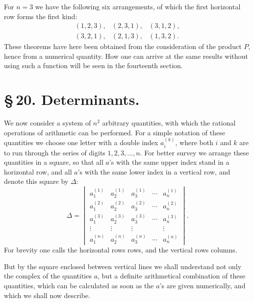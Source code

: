 \documentclass[11pt]{article}
\begin{document}
For \(n=3\) we have the following six arrangements, of which the first horizontal row forms the first kind:
\[
\begin{array}{ccc}
(1,2,3),&(2,3,1),&(3,1,2),\\
(3,2,1),&(2,1,3),&(1,3,2).
\end{array}
\]
These theorems have here been obtained from the consideration of the product \(P\), hence from a numerical quantity. How one can arrive at the same results without using such a function will be seen in the fourteenth section.

\section*{\S\,20. Determinants.}

We now consider a system of \(n^2\) arbitrary quantities, with which the rational operations of arithmetic can be performed. For a simple notation of these quantities we choose one letter with a double index \(a_i^{(k)}\), where both \(i\) and \(k\) are to run through the series of digits \(1,2,3,\ldots,n\). For better survey we arrange these quantities in a square, so that all \(a\)'s with the same upper index stand in a horizontal row, and all \(a\)'s with the same lower index in a vertical row, and denote this square by \(\Delta\):
\begin{equation}
\Delta=
\begin{vmatrix}
 a_1^{(1)}&a_2^{(1)}&a_3^{(1)}&\cdots&a_n^{(1)}\\
 a_1^{(2)}&a_2^{(2)}&a_3^{(2)}&\cdots&a_n^{(2)}\\
 a_1^{(3)}&a_2^{(3)}&a_3^{(3)}&\cdots&a_n^{(3)}\\
 \vdots&\vdots&\vdots&&\vdots\\
 a_1^{(n)}&a_2^{(n)}&a_3^{(n)}&\cdots&a_n^{(n)}
\end{vmatrix}.
\tag{1}
\end{equation}
For brevity one calls the horizontal rows rows, and the vertical rows columns.

But by the square enclosed between vertical lines we shall understand not only the complex of the quantities \(a\), but a definite arithmetical combination of these quantities, which can be calculated as soon as the \(a\)'s are given numerically, and which we shall now describe.
\end{document}
